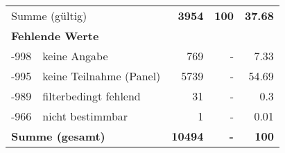 \begin{longtable}{lXrrr}
     \midrule
     \multicolumn{2}{l}{Summe (gültig)} &
       \textbf{\num{3954}} &
     \textbf{100} &
       \textbf{\num[round-mode=places,round-precision=2]{37,68}} \\
     \multicolumn{5}{l}{\textbf{Fehlende Werte}}\\
       -998 &
       keine Angabe &
         \num{769} &
        - &
         \num[round-mode=places,round-precision=2]{7,33} \\
       -995 &
       keine Teilnahme (Panel) &
         \num{5739} &
        - &
         \num[round-mode=places,round-precision=2]{54,69} \\
       -989 &
       filterbedingt fehlend &
         \num{31} &
        - &
         \num[round-mode=places,round-precision=2]{0,3} \\
       -966 &
       nicht bestimmbar &
         \num{1} &
        - &
         \num[round-mode=places,round-precision=2]{0,01} \\
     \midrule
     \multicolumn{2}{l}{\textbf{Summe (gesamt)}} &
          \textbf{\num{10494}} &
        \textbf{-} &
        \textbf{100} \\
     \bottomrule
     \end{longtable}
     
